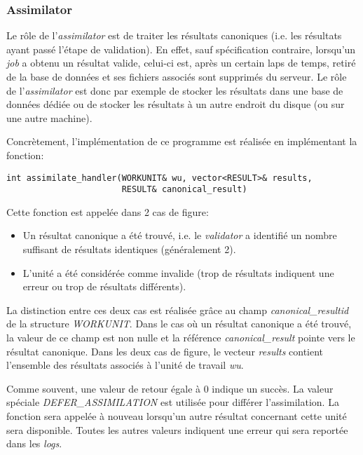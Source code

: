 \documentclass[a4paper, 11pt]{report}
\begin{document}
\subsubsection{Assimilator}
Le rôle de l'\textit{assimilator} est de traiter les résultats canoniques (i.e. les résultats ayant passé l'étape de validation). En effet, sauf spécification contraire, lorsqu'un \textit{job} a obtenu un résultat valide, celui-ci est, après un certain laps de temps, retiré de la base de données et ses fichiers associés sont supprimés du serveur. Le rôle de l'\textit{assimilator} est donc par exemple de stocker les résultats dans une base de données dédiée ou de stocker les résultats à un autre endroit du disque (ou sur une autre machine).

Concrètement, l'implémentation de ce programme est réalisée en implémentant la fonction:
\begin{verbatim}
int assimilate_handler(WORKUNIT& wu, vector<RESULT>& results, 
                       RESULT& canonical_result)
\end{verbatim}

Cette fonction est appelée dans 2 cas de figure:
\begin{itemize}
\item Un résultat canonique a été trouvé, i.e. le \textit{validator} a identifié un nombre suffisant de résultats identiques (généralement 2).
\item L'unité a été considérée comme invalide (trop de résultats indiquent une erreur ou trop de résultats différents).
\end{itemize}
La distinction entre ces deux cas est réalisée grâce au champ \textit{canonical\_resultid} de la structure \textit{WORKUNIT}. Dans le cas où un résultat canonique a été trouvé, la valeur de ce champ est non nulle et la référence \textit{canonical\_result} pointe vers le résultat canonique. Dans les deux cas de figure, le vecteur \textit{results} contient l'ensemble des résultats associés à l'unité de travail \textit{wu}.

Comme souvent, une valeur de retour égale à 0 indique un succès. La valeur spéciale \textit{DEFER\_ASSIMILATION} est utilisée pour différer l'assimilation. La fonction sera appelée à nouveau lorsqu'un autre résultat concernant cette unité sera disponible. Toutes les autres valeurs indiquent une erreur qui sera reportée dans les \textit{logs}.

\end{document}
